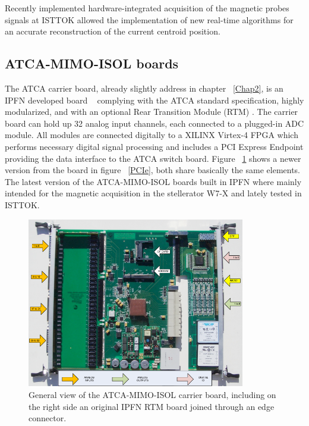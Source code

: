 Recently implemented hardware-integrated acquisition of the magnetic probes signals at ISTTOK allowed the implementation of new real-time algorithms for an accurate reconstruction of the current centroid position. \smallskip

\subsection{ATCA-MIMO-ISOL boards}

The ATCA carrier board, already slightly address in chapter ~\ref{Chap2}, is an IPFN developed board ~\cite{Batista2010} complying with the ATCA standard specification, highly modularized, and with an optional Rear Transition Module (RTM) . The carrier board can hold up 32 analog input channels, each connected to a plugged-in ADC module. All modules are connected digitally to a XILINX Virtex-4 FPGA which performs necessary digital signal processing and includes a PCI Express Endpoint providing the data interface to the ATCA switch board. Figure ~\ref{ATCA_ISOL} shows a newer version   from the board in figure ~\ref{PCIe}, both share basically the same elements. The latest version of the ATCA-MIMO-ISOL boards built in IPFN where mainly intended for the magnetic acquisition in the stellerator W7-X and lately tested in ISTTOK.  
\smallskip




\begin{figure}[htbp]
	\centering
	\includegraphics[width=0.85\textwidth]{Chp4/ATCA_MIMO_ISOL.png}
	\caption{\label{ATCA_ISOL} General view of the ATCA-MIMO-ISOL carrier board, including on the right side an original IPFN RTM board joined through an edge connector. }
\end{figure}

